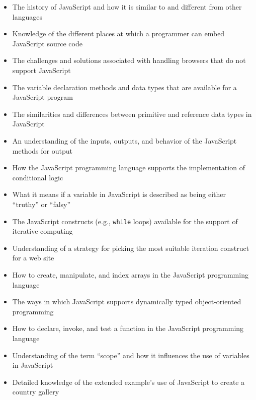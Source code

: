 \documentclass[11pt]{article}
\begin{document}
\begin{itemize}

  \itemsep 0.05in

  \item The history of JavaScript and how it is similar to and different from
    other languages

  \item Knowledge of the different places at which a programmer can embed
    JavaScript source code

  \item The challenges and solutions associated with handling browsers that do
    not support JavaScript

  \item The variable declaration methods and data types that are available for a
    JavaScript program

  \item The similarities and differences between primitive and reference data
    types in JavaScript

  \item An understanding of the inputs, outputs, and behavior of the JavaScript
    methods for output

  \item How the JavaScript programming language supports the implementation of
    conditional logic

  \item What it means if a variable in JavaScript is described as being either
    ``truthy'' or ``falsy''

  \item The JavaScript constructs (e.g., {\tt while} loops) available for the
    support of iterative computing

  \item Understanding of a strategy for picking the most suitable iteration
    construct for a web site

  \item How to create, manipulate, and index arrays in the JavaScript
    programming language

  \item The ways in which JavaScript supports dynamically typed object-oriented
    programming

  \item How to declare, invoke, and test a function in the JavaScript
    programming language

  \item Understanding of the term ``scope'' and how it influences the use of
    variables in JavaScript

  \item Detailed knowledge of the extended example's use of JavaScript to create
    a country gallery

\end{itemize}
\end{document}
